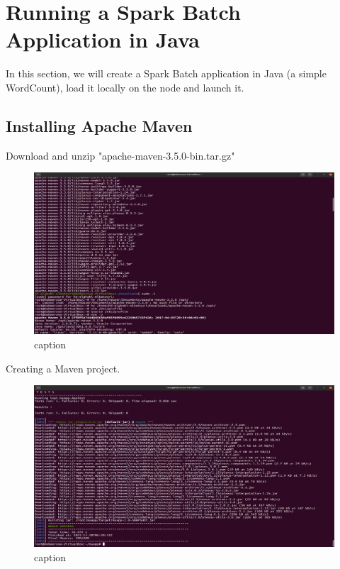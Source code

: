 \chapter{Running a Spark Batch Application in Java}
\par In this section, we will create a Spark Batch application in Java (a simple WordCount), load it locally on the node and launch it.
\begin{spacing}{1.2}
\section{Installing Apache Maven}

\par Download and unzip "apache-maven-3.5.0-bin.tar.gz"
\\
\begin{figure}[!htb] 
\begin{center} 
\includegraphics[width=1\linewidth]{Big_Data/Spark/Running a Spark Batch app in Java/Installing Maven.jpg} 
\end{center} 
\caption{caption} 
\end{figure} 
\FloatBarrier



\par Creating a Maven project.
\\
\begin{figure}[!htb] 
\begin{center} 
\includegraphics[width=1\linewidth]{Big_Data/Spark/Running a Spark Batch app in Java/Maven Build Success.jpg} 
\end{center} 
\caption{caption} 
\end{figure} 
\FloatBarrier


\end{spacing}
